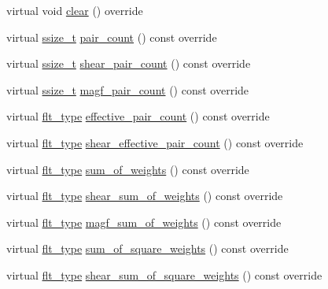 \begin{DoxyCompactItemize}
\item 
virtual void \hyperlink{classIceBRG_1_1pair__bin_accb7e0a9d26acf6b3444160f2c3718c5}{clear} () override
\item 
virtual \hyperlink{lib_2IceBRG__main_2common_8h_ab322a3e50421dc5f0c43316b1b373592}{ssize\+\_\+t} \hyperlink{classIceBRG_1_1pair__bin_a615261e23225eabf0d462d3ab3f23b0e}{pair\+\_\+count} () const  override
\item 
virtual \hyperlink{lib_2IceBRG__main_2common_8h_ab322a3e50421dc5f0c43316b1b373592}{ssize\+\_\+t} \hyperlink{classIceBRG_1_1pair__bin_a68663cca2c8663319b23be1656bba931}{shear\+\_\+pair\+\_\+count} () const  override
\item 
virtual \hyperlink{lib_2IceBRG__main_2common_8h_ab322a3e50421dc5f0c43316b1b373592}{ssize\+\_\+t} \hyperlink{classIceBRG_1_1pair__bin_a6056ee4f8a8ca91d4675574f40de40d1}{magf\+\_\+pair\+\_\+count} () const  override
\item 
virtual \hyperlink{lib_2IceBRG__main_2common_8h_ad0f130a56eeb944d9ef2692ee881ecc4}{flt\+\_\+type} \hyperlink{classIceBRG_1_1pair__bin_a128b9c3139e2ffccb98ed4856b88a028}{effective\+\_\+pair\+\_\+count} () const  override
\item 
virtual \hyperlink{lib_2IceBRG__main_2common_8h_ad0f130a56eeb944d9ef2692ee881ecc4}{flt\+\_\+type} \hyperlink{classIceBRG_1_1pair__bin_ae42bad2b49096eac461cad44897a4be8}{shear\+\_\+effective\+\_\+pair\+\_\+count} () const  override
\item 
virtual \hyperlink{lib_2IceBRG__main_2common_8h_ad0f130a56eeb944d9ef2692ee881ecc4}{flt\+\_\+type} \hyperlink{classIceBRG_1_1pair__bin_a1419121ef0e69e056ae191abee8ff96a}{sum\+\_\+of\+\_\+weights} () const  override
\item 
virtual \hyperlink{lib_2IceBRG__main_2common_8h_ad0f130a56eeb944d9ef2692ee881ecc4}{flt\+\_\+type} \hyperlink{classIceBRG_1_1pair__bin_a6e407273cef5091b90d8edecfde743b5}{shear\+\_\+sum\+\_\+of\+\_\+weights} () const  override
\item 
virtual \hyperlink{lib_2IceBRG__main_2common_8h_ad0f130a56eeb944d9ef2692ee881ecc4}{flt\+\_\+type} \hyperlink{classIceBRG_1_1pair__bin_aa13fdfc37c72a1a3dadbac9362c67a0c}{magf\+\_\+sum\+\_\+of\+\_\+weights} () const  override
\item 
virtual \hyperlink{lib_2IceBRG__main_2common_8h_ad0f130a56eeb944d9ef2692ee881ecc4}{flt\+\_\+type} \hyperlink{classIceBRG_1_1pair__bin_a0a85c5fb90776b70059299f39c595ccb}{sum\+\_\+of\+\_\+square\+\_\+weights} () const  override
\item 
virtual \hyperlink{lib_2IceBRG__main_2common_8h_ad0f130a56eeb944d9ef2692ee881ecc4}{flt\+\_\+type} \hyperlink{classIceBRG_1_1pair__bin_a031341d28bd8d6f803b8f508b2acdea1}{shear\+\_\+sum\+\_\+of\+\_\+square\+\_\+weights} () const  override

\end{DoxyCompactItemize}

